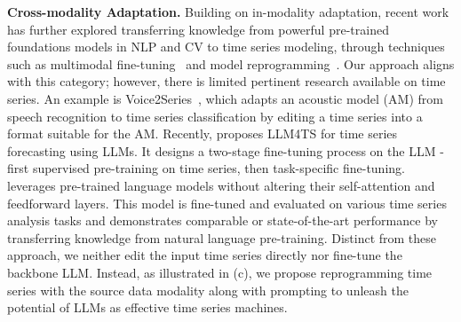 \noindent\textbf{Cross-modality Adaptation.} Building on in-modality adaptation, recent work has further explored transferring knowledge from powerful pre-trained foundations models in NLP and CV to time series modeling, through techniques such as multimodal fine-tuning~\citep{yin2023survey} and model reprogramming~\citep{chen2022model}. Our approach aligns with this category; however, there is limited pertinent research available on time series. An example is Voice2Series~\citep{yang2021voice2series}, which adapts an acoustic model (AM) from speech recognition to time series classification by editing a time series into a format suitable for the AM. Recently, \cite{chang2023llm4ts} proposes LLM4TS for time series forecasting using LLMs. It designs a two-stage fine-tuning process on the LLM - first supervised pre-training on time series, then task-specific fine-tuning. \cite{zhou2023one} leverages pre-trained language models without altering their self-attention and feedforward layers. This model is fine-tuned and evaluated on various time series analysis tasks and demonstrates comparable or state-of-the-art performance by transferring knowledge from natural language pre-training. Distinct from these approach, we neither edit the input time series directly nor fine-tune the backbone LLM. Instead, as illustrated in (c), we propose reprogramming time series with the source data modality along with prompting to unleash the potential of LLMs as effective time series machines.